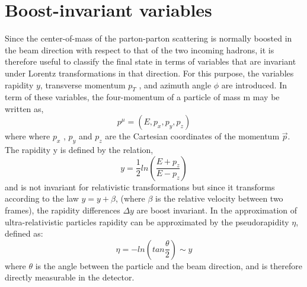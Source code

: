 \documentclass[PhD,binding=0.6cm]{../sapthesis}
\begin{document}
\chapter{Boost-invariant variables}
\label{psr}
Since the center-of-mass of the parton-parton scattering is normally boosted in the beam
direction with respect to that of the two incoming hadrons, it is therefore useful to classify
the final state in terms of variables that are invariant under Lorentz transformations in
that direction. For this purpose, the variables rapidity $y$, transverse momentum $p_T$ , and
azimuth angle $\phi$ are introduced. In term of these variables, the four-momentum of a
particle of mass m may be written as,
\begin{equation}
p^{\mu}=(E,p_x,p_y,p_z)
\end{equation}
where where $p_x$ , $p_y$ and $p_z$ are the Cartesian coordinates of the momentum $\vec{p}$. 
The rapidity y is defined by the relation,
\begin{equation}
y=\frac{1}{2} ln (\frac{E+p_z}{E-p_z})
\end{equation}
and is not invariant for relativistic transformations but since it transforms according to
the law $y = y + \beta$, (where $\beta$ is the relative velocity between two frames), the rapidity
differences $\Delta y$ are boost invariant. In the approximation of ultra-relativistic particles rapidity can be approximated by the pseudorapidity $\eta$, defined as:
\begin{equation}
\eta=- ln (tan \frac{\theta}{2}) \sim y
\end{equation}
where $\theta$ is the angle between the particle and the beam direction, and
is therefore directly measurable in the detector.
\end{document}

